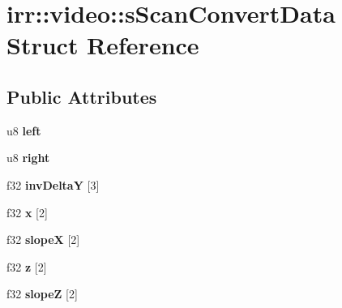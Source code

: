 \hypertarget{structirr_1_1video_1_1s_scan_convert_data}{\section{irr\-:\-:video\-:\-:s\-Scan\-Convert\-Data Struct Reference}
\label{structirr_1_1video_1_1s_scan_convert_data}
}
\subsection*{Public Attributes}
\begin{DoxyCompactItemize}
\item 
\hypertarget{structirr_1_1video_1_1s_scan_convert_data_a4977b428846b928906e6442cfdf21637}{u8 {\bfseries left}}\label{structirr_1_1video_1_1s_scan_convert_data_a4977b428846b928906e6442cfdf21637}

\item 
\hypertarget{structirr_1_1video_1_1s_scan_convert_data_ab2f8e20a1e23ddc2a7c98c0e93b7be86}{u8 {\bfseries right}}\label{structirr_1_1video_1_1s_scan_convert_data_ab2f8e20a1e23ddc2a7c98c0e93b7be86}

\item 
\hypertarget{structirr_1_1video_1_1s_scan_convert_data_a56eaab95c985e43fde32faaf23cca791}{f32 {\bfseries inv\-Delta\-Y} \mbox{[}3\mbox{]}}\label{structirr_1_1video_1_1s_scan_convert_data_a56eaab95c985e43fde32faaf23cca791}

\item 
\hypertarget{structirr_1_1video_1_1s_scan_convert_data_a351fcbe8e7ea55662688124db7c47155}{f32 {\bfseries x} \mbox{[}2\mbox{]}}\label{structirr_1_1video_1_1s_scan_convert_data_a351fcbe8e7ea55662688124db7c47155}

\item 
\hypertarget{structirr_1_1video_1_1s_scan_convert_data_a87b16735b9b956524bf42d8763b741bb}{f32 {\bfseries slope\-X} \mbox{[}2\mbox{]}}\label{structirr_1_1video_1_1s_scan_convert_data_a87b16735b9b956524bf42d8763b741bb}

\item 
\hypertarget{structirr_1_1video_1_1s_scan_convert_data_ae85defa30b4fefa254638767adf3616a}{f32 {\bfseries z} \mbox{[}2\mbox{]}}\label{structirr_1_1video_1_1s_scan_convert_data_ae85defa30b4fefa254638767adf3616a}

\item 
\hypertarget{structirr_1_1video_1_1s_scan_convert_data_a90e74051aad6a5c87c821b61812ee086}{f32 {\bfseries slope\-Z} \mbox{[}2\mbox{]}}\label{structirr_1_1video_1_1s_scan_convert_data_a90e74051aad6a5c87c821b61812ee086}


\end{DoxyCompactItemize}
